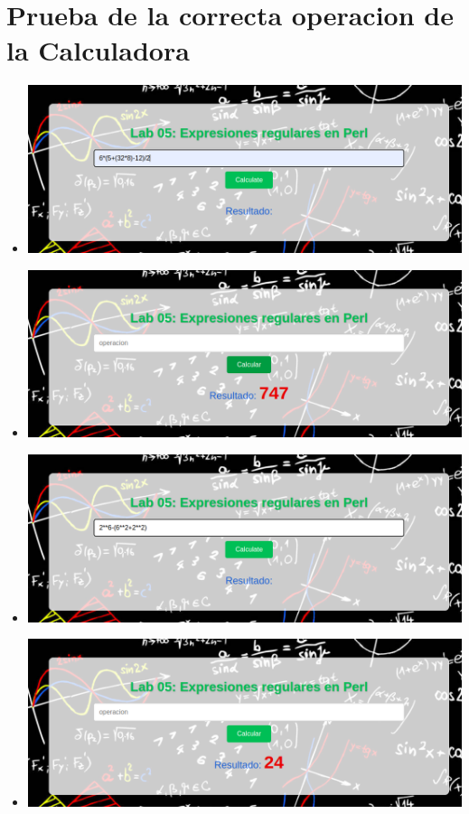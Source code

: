 \documentclass{article}
\begin{document}
        \section{Prueba de la correcta operacion de la Calculadora}
            \begin{itemize}
                \centering
                \item [] \includegraphics[width=1 \textwidth]{Lab5/latex/img/Pruebas/prueba1.png}
                \item [] \includegraphics[width=1 \textwidth]{Lab5/latex/img/Pruebas/rptaPrueba1.png}
                \item [] \includegraphics[width=1 \textwidth]{Lab5/latex/img/Pruebas/prueba2.png}
                \item [] \includegraphics[width=0.9 \textwidth]{Lab5/latex/img/Pruebas/rptaPrueba2.png}

\end{itemize}
\end{document}
